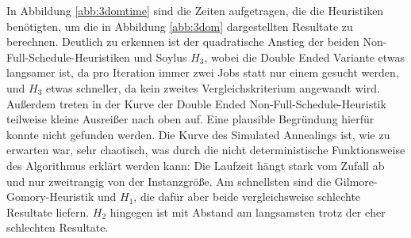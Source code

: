 \documentclass{scrreprt}
\begin{document}
In Abbildung \ref{abb:3domtime} sind die Zeiten aufgetragen, die die Heuristiken benötigten, um die in Abbildung \ref{abb:3dom} dargestellten Resultate zu berechnen.
Deutlich zu erkennen ist der quadratische Anstieg der beiden Non-Full-Schedule-Heuristiken und Soylus $H_3$, wobei die Double Ended Variante etwas langsamer ist,
da pro Iteration immer zwei Jobs statt nur einem gesucht werden, und $H_3$ etwas schneller, da kein zweites Vergleichskriterium angewandt wird.
Außerdem treten in der Kurve der Double Ended Non-Full-Schedule-Heuristik teilweise kleine Ausreißer nach oben auf.
Eine plausible Begründung hierfür konnte nicht gefunden werden.
Die Kurve des Simulated Annealings ist, wie zu erwarten war, sehr chaotisch, was durch die nicht deterministische Funktionsweise des Algorithmus erklärt werden kann:
Die Laufzeit hängt stark vom Zufall ab und nur zweitrangig von der Instanzgröße.
Am schnellsten sind die Gilmore-Gomory-Heuristik und $H_1$, die dafür aber beide vergleichsweise schlechte Resultate liefern.
$H_2$ hingegen ist mit Abstand am langsamsten trotz der eher schlechten Resultate.
\end{document}
